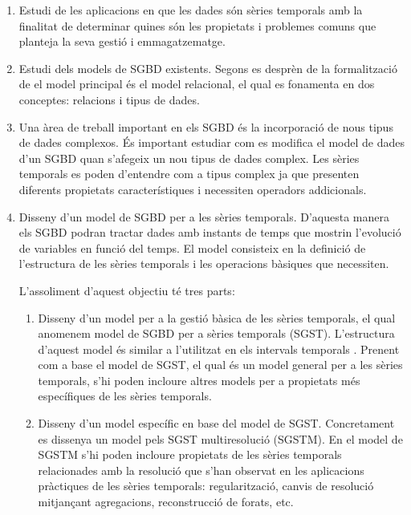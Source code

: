 \begin{enumerate}

\item Estudi de les aplicacions en que les dades són sèries temporals
  amb la finalitat de determinar quines són les propietats i problemes
  comuns que planteja la seva gestió i emmagatzematge.

\item Estudi dels models de SGBD existents. Segons es desprèn de la
  formalització de \textcite{date:introduction} el model principal és
  el model relacional, el qual es fonamenta en dos conceptes:
  relacions i tipus de dades. 

\item Una àrea de treball important en els SGBD és la incorporació de
  nous tipus de dades complexos. És important estudiar com es modifica
  el model de dades d'un SGBD quan s'afegeix un nou tipus de dades
  complex.  Les sèries temporals es poden d'entendre com a tipus
  complex ja que presenten diferents propietats característiques i
  necessiten operadors addicionals.  

\item Disseny d'un model de SGBD per a les sèries temporals. D'aquesta
  manera els SGBD podran tractar dades amb instants de temps que
  mostrin l'evolució de variables en funció del temps. El model
  consisteix en la definició de l'estructura de les sèries temporals i
  les operacions bàsiques que necessiten.

  L'assoliment d'aquest objectiu té tres parts:

  \begin{enumerate}
  \item Disseny d'un model per a la gestió bàsica de les sèries
    temporals, el qual anomenem model de SGBD per a sèries temporals
    (SGST).  L'estructura d'aquest model és similar a l'utilitzat en
    els intervals
    temporals \parencite{date02:_tempor_data_relat_model}.  Prenent
    com a base el model de SGST, el qual és un model general per a les
    sèries temporals, s'hi poden incloure altres models per a
    propietats més específiques de les sèries temporals.

  \item Disseny d'un model específic en base del model de
    SGST. Concretament es dissenya un model pels SGST multiresolució
    (SGSTM).  En el model de SGSTM s'hi poden incloure propietats de
    les sèries temporals relacionades amb la resolució que s'han
    observat en les aplicacions pràctiques de les sèries temporals:
    regularització, canvis de resolució mitjançant agregacions,
    reconstrucció de forats, etc.
 

\end{enumerate}
\end{enumerate}
